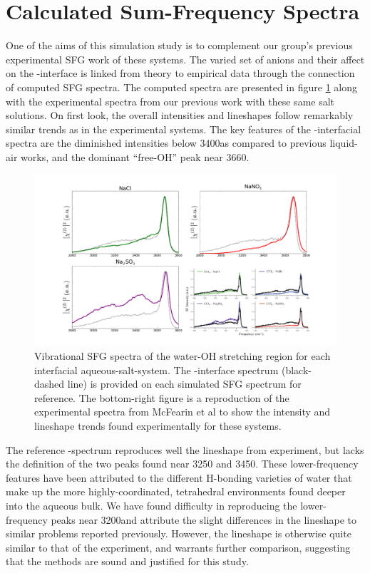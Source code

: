 \section{Calculated Sum-Frequency Spectra}

One of the aims of this simulation study is to complement our group's previous experimental SFG work of these systems.\cite{McFearin2009} The varied set of anions and their affect on the \ctc-\wat interface is linked from theory to empirical data through the connection of computed SFG spectra. The computed spectra are presented in figure \ref{fig:sfg-spectra} along with the experimental spectra from our previous work with these same salt solutions.\cite{McFearin2009} On first look, the overall intensities and lineshapes follow remarkably similar trends as in the experimental systems. The key features of the \ctc-\wat interfacial spectra are the diminished intensities below 3400\cm as compared to previous liquid-air works, and the dominant ``free-OH'' peak near 3660\cm.

\begin{figure}[h!]
\begin{center}
	\includegraphics[scale=1.0]{images/sfg-spectra.png}
	\caption{Vibrational SFG spectra of the water-OH stretching region for each interfacial aqueous-salt-\ctc system. The \ctc-\wat interface spectrum (black-dashed line) is provided on each simulated SFG spectrum for reference. The bottom-right figure is a reproduction of the experimental spectra from McFearin et al to show the intensity and lineshape trends found experimentally for these systems.\cite{McFearin2009}}
	\label{fig:sfg-spectra}
\end{center}
\end{figure}

The reference \ctc-\wat spectrum reproduces well the lineshape from experiment, but lacks the definition of the two peaks found near 3250 and 3450\cm. These lower-frequency features have been attributed to the different H-bonding varieties of water that make up the more highly-coordinated, tetrahedral environments found deeper into the aqueous bulk. We have found difficulty in reproducing the lower-frequency peaks near 3200\cm and attribute the slight differences in the lineshape to similar problems reported previously.\cite{Walker2006b} However, the lineshape is otherwise quite similar to that of the experiment, and warrants further comparison, suggesting that the methods are sound and justified for this study.


